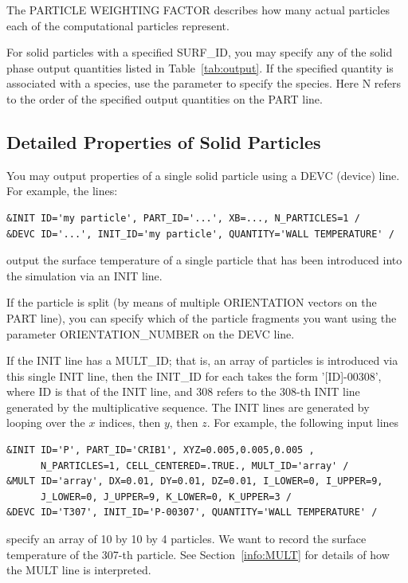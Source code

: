 \documentclass[11pt]{book}
\begin{document}
The {\ct PARTICLE WEIGHTING FACTOR} describes how many actual particles each of the computational particles represent.

For solid particles with a specified {\ct SURF\_ID}, you may specify any of the solid phase output quantities listed in Table~\ref{tab:output}. If the specified quantity is associated with a species, use the parameter  to specify the species. Here {\ct N} refers to the order of the specified output quantities on the {\ct PART} line.


\subsection{Detailed Properties of Solid Particles}

You may output properties of a single solid particle using a {\ct DEVC} (device) line. For example, the lines:
\begin{lstlisting}
&INIT ID='my particle', PART_ID='...', XB=..., N_PARTICLES=1 /
&DEVC ID='...', INIT_ID='my particle', QUANTITY='WALL TEMPERATURE' /
\end{lstlisting}
output the surface temperature of a single particle that has been introduced into the simulation via an {\ct INIT} line.

If the particle is split (by means of multiple {\ct ORIENTATION} vectors on the {\ct PART} line), you can specify which of the particle fragments you want using the parameter {\ct ORIENTATION\_NUMBER} on the {\ct DEVC} line.

If the {\ct INIT} line has a {\ct MULT\_ID}; that is, an array of particles is introduced via this single {\ct INIT} line, then the {\ct INIT\_ID} for each takes the form {\ct '[ID]-00308'}, where {\ct ID} is that of the {\ct INIT} line, and 308 refers to the 308-th {\ct INIT} line generated by the multiplicative sequence. The {\ct INIT} lines are generated by looping over the $x$ indices, then $y$, then $z$. For example, the following input lines
\begin{lstlisting}
&INIT ID='P', PART_ID='CRIB1', XYZ=0.005,0.005,0.005 ,
      N_PARTICLES=1, CELL_CENTERED=.TRUE., MULT_ID='array' /
&MULT ID='array', DX=0.01, DY=0.01, DZ=0.01, I_LOWER=0, I_UPPER=9,
      J_LOWER=0, J_UPPER=9, K_LOWER=0, K_UPPER=3 /
&DEVC ID='T307', INIT_ID='P-00307', QUANTITY='WALL TEMPERATURE' /
\end{lstlisting}
specify an array of 10 by 10 by 4 particles. We want to record the surface temperature of the 307-th particle. See Section~\ref{info:MULT} for details of how the {\ct MULT} line is interpreted.
\end{document}
